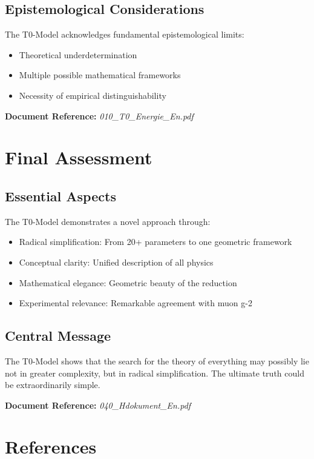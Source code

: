 \subsection{Epistemological Considerations}

The T0-Model acknowledges fundamental epistemological limits:
\begin{itemize}
	\item Theoretical underdetermination
	\item Multiple possible mathematical frameworks
	\item Necessity of empirical distinguishability
\end{itemize}

\textbf{Document Reference:} \textit{010\_T0\_Energie\_En.pdf}

\section{Final Assessment}

\subsection{Essential Aspects}

The T0-Model demonstrates a novel approach through:

\begin{itemize}
	\item Radical simplification: From 20+ parameters to one geometric framework
	\item Conceptual clarity: Unified description of all physics
	\item Mathematical elegance: Geometric beauty of the reduction
	\item Experimental relevance: Remarkable agreement with muon g-2
\end{itemize}

\subsection{Central Message}

The T0-Model shows that the search for the theory of everything may possibly lie not in greater complexity, but in radical simplification. The ultimate truth could be extraordinarily simple.

\textbf{Document Reference:} \textit{040\_Hdokument\_En.pdf}

\section{References}

